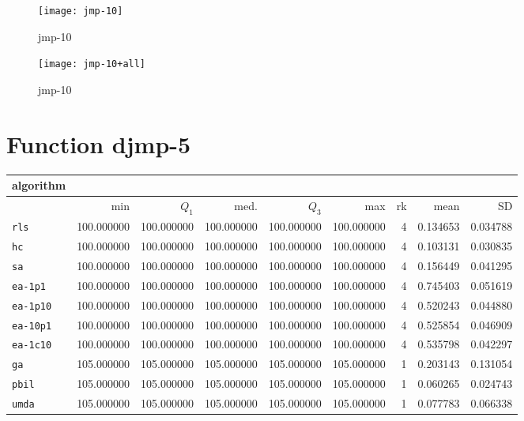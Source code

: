 \begin{center}
\begin{figure}[h]
\centering
\texttt{[image: jmp-10]}
\caption{jmp-10}
\end{figure}
\end{center}

\begin{center}
\begin{figure}[h]
\centering
\texttt{[image: jmp-10+all]}
\caption{jmp-10}
\end{figure}
\end{center}

\newpage

\section{Function djmp-5}
\begin{center}
\begin{tabular}{@{}l*{5}{>{{}}N{3}{0}}>{{}}N{2}{0}N{1}{3}N{1}{3}@{}}
\toprule
{algorithm} &  &  \\
\midrule
& {min} & {$Q_1$} & {med.} & {$Q_3$} & {max} & {rk} & {mean} & {SD} \\
\midrule
\verb|rls| & 100.000000 & 100.000000 & 100.000000 & 100.000000 & 100.000000 & 4 & 0.134653 & 0.034788 \\
 \verb|hc| & 100.000000 & 100.000000 & 100.000000 & 100.000000 & 100.000000 & 4 & 0.103131 & 0.030835 \\
 \verb|sa| & 100.000000 & 100.000000 & 100.000000 & 100.000000 & 100.000000 & 4 & 0.156449 & 0.041295 \\
 \verb|ea-1p1| & 100.000000 & 100.000000 & 100.000000 & 100.000000 & 100.000000 & 4 & 0.745403 & 0.051619 \\
 \verb|ea-1p10| & 100.000000 & 100.000000 & 100.000000 & 100.000000 & 100.000000 & 4 & 0.520243 & 0.044880 \\
 \verb|ea-10p1| & 100.000000 & 100.000000 & 100.000000 & 100.000000 & 100.000000 & 4 & 0.525854 & 0.046909 \\
 \verb|ea-1c10| & 100.000000 & 100.000000 & 100.000000 & 100.000000 & 100.000000 & 4 & 0.535798 & 0.042297 \\
 \verb|ga| & {\color{blue}} 105.000000 & {\color{blue}} 105.000000 & {\color{blue}} 105.000000 & {\color{blue}} 105.000000 & {\color{blue}} 105.000000 & 1 & 0.203143 & 0.131054 \\
 \verb|pbil| & {\color{blue}} 105.000000 & {\color{blue}} 105.000000 & {\color{blue}} 105.000000 & {\color{blue}} 105.000000 & {\color{blue}} 105.000000 & 1 & 0.060265 & 0.024743 \\
 \verb|umda| & {\color{blue}} 105.000000 & {\color{blue}} 105.000000 & {\color{blue}} 105.000000 & {\color{blue}} 105.000000 & {\color{blue}} 105.000000 & 1 & 0.077783 & 0.066338 \\
 \bottomrule
\end{tabular}
\end{center}

